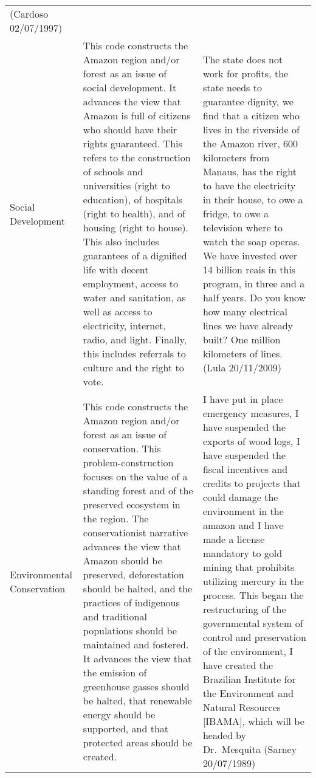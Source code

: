 \documentclass[
]{article}
\begin{document}
\begin{longtable}[]{@{}lll@{}}
(Cardoso 02/07/1997) \\
Social Development & This code constructs the Amazon region and/or
forest as an issue of social development. It advances the view that
Amazon is full of citizens who should have their rights guaranteed. This
refers to the construction of schools and universities (right to
education), of hospitals (right to health), and of housing (right to
house). This also includes guarantees of a dignified life with decent
employment, access to water and sanitation, as well as access to
electricity, internet, radio, and light. Finally, this includes
referrals to culture and the right to vote. & The state does not work
for profits, the state needs to guarantee dignity, we find that a
citizen who lives in the riverside of the Amazon river, 600 kilometers
from Manaus, has the right to have the electricity in their house, to
owe a fridge, to owe a television where to watch the soap operas. We
have invested over 14 billion reais in this program, in three and a half
years. Do you know how many electrical lines we have already built? One
million kilometers of lines. (Lula 20/11/2009) \\
Environmental Conservation & This code constructs the Amazon region
and/or forest as an issue of conservation. This problem-construction
focuses on the value of a standing forest and of the preserved ecosystem
in the region. The conservationist narrative advances the view that
Amazon should be preserved, deforestation should be halted, and the
practices of indigenous and traditional populations should be maintained
and fostered. It advances the view that the emission of greenhouse
gasses should be halted, that renewable energy should be supported, and
that protected areas should be created. & I have put in place emergency
measures, I have suspended the exports of wood logs, I have suspended
the fiscal incentives and credits to projects that could damage the
environment in the amazon and I have made a license mandatory to gold
mining that prohibits utilizing mercury in the process. This began the
restructuring of the governmental system of control and preservation of
the environment, I have created the Brazilian Institute for the
Environment and Natural Resources {[}IBAMA{]}, which will be headed by
Dr.~Mesquita (Sarney 20/07/1989) \\
\bottomrule
\end{longtable}
\end{document}
